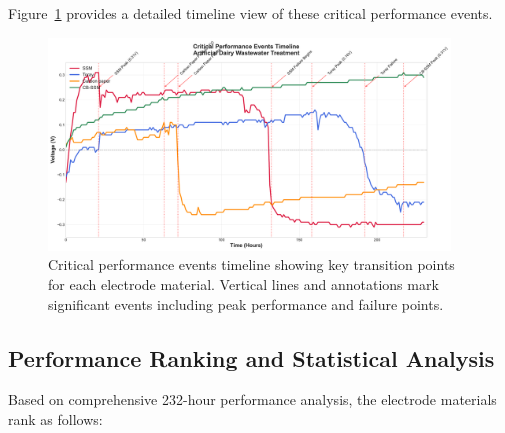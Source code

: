 \documentclass[12pt,a4paper]{article}
\begin{document}
Figure~\ref{fig:timeline_analysis} provides a detailed timeline view of these critical performance events.

\begin{figure}[H]
\centering
\includegraphics[width=0.95\textwidth]{timeline_analysis.pdf}
\caption{Critical performance events timeline showing key transition points for each electrode material. Vertical lines and annotations mark significant events including peak performance and failure points.}
\label{fig:timeline_analysis}
\end{figure}

\subsection{Performance Ranking and Statistical Analysis}

Based on comprehensive 232-hour performance analysis, the electrode materials rank as follows:
\end{document}
